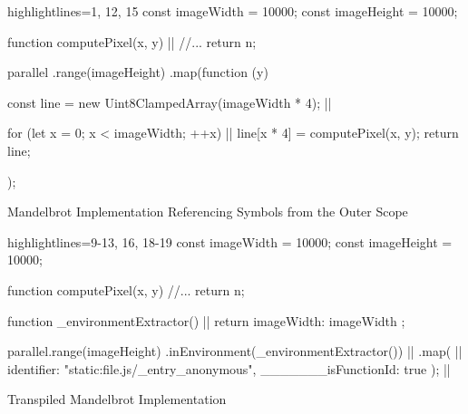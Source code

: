 \begin{listing}
	\begin{javascriptcode*}{highlightlines={1, 12, 15}}
const imageWidth = 10000;
const imageHeight = 10000;

function computePixel(x, y) { |$\label{code:mandelbrot-compute-pixel}$|
	//...  
	return n;
}
	
parallel
	.range(imageHeight)
	.map(function (y) {
		const line = new Uint8ClampedArray(imageWidth * 4); |$\label{code:mandelbrot-reference1-imageWidth}$|

		for (let x = 0; x < imageWidth; ++x) { |$\label{code:mandelbrot-reference2-imageWidth}$|
			line[x * 4] = computePixel(x, y);
		}
		return line;
});	
	\end{javascriptcode*}
	\caption{Mandelbrot Implementation Referencing Symbols from the Outer Scope}
	\label{fig:mandelbrot-untranspiled}
\end{listing}

\begin{listing}
	\begin{javascriptcode*}{highlightlines={9-13, 16, 18-19}}
const imageWidth = 10000;
const imageHeight = 10000;

function computePixel(x, y) {
	//...
	return n;
}

function _environmentExtractor() { |$\label{code:mandelbrot-environment-extractor}$|
	return {
		imageWidth: imageWidth
	};
}

parallel.range(imageHeight)
	.inEnvironment(_environmentExtractor()) |$\label{code:mandelbrot-environment-call}$|
	.map({ |$\label{code:mandelbrot-function-id-start}$|
		identifier: "static:file.js/_entry_anonymous",
		_______isFunctionId: true
	});	|$\label{code:mandelbrot-function-id-end}$|
\end{javascriptcode*}
\caption{Transpiled Mandelbrot Implementation}
\label{fig:mandelbrot-transpiled}
\end{listing}



